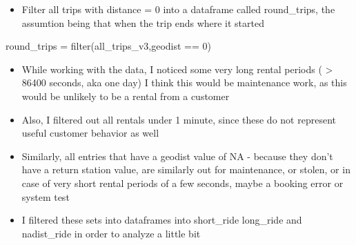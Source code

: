 \documentclass[
]{article}
\newenvironment{Shaded}{\begin{snugshade}}{\end{snugshade}}
\newcommand{\DecValTok}[1]{\textcolor[rgb]{0.00,0.00,0.81}{#1}}
\newcommand{\FunctionTok}[1]{\textcolor[rgb]{0.00,0.00,0.00}{#1}}
\newcommand{\NormalTok}[1]{#1}
\newcommand{\OtherTok}[1]{\textcolor[rgb]{0.56,0.35,0.01}{#1}}
\newcommand{\SpecialCharTok}[1]{\textcolor[rgb]{0.00,0.00,0.00}{#1}}
\providecommand{\tightlist}{%
  \setlength{\itemsep}{0pt}\setlength{\parskip}{0pt}}
\begin{document}
\fontsize{10}{12}
\selectfont

\begin{itemize}
\tightlist
\item
  Filter all trips with distance = 0 into a dataframe called
  round\_trips, the assumtion being that when the trip ends where it
  started
\end{itemize}

\fontsize{9}{11}
\selectfont

\begin{Shaded}
\begin{Highlighting}[]
\NormalTok{round\_trips }\OtherTok{=} \FunctionTok{filter}\NormalTok{(all\_trips\_v3,geodist }\SpecialCharTok{==} \DecValTok{0}\NormalTok{)}
\end{Highlighting}
\end{Shaded}

\fontsize{10}{12}
\selectfont

\begin{itemize}
\item
  While working with the data, I noticed some very long rental periods (
  \textgreater{} 86400 seconds, aka one day) I think this would be
  maintenance work, as this would be unlikely to be a rental from a
  customer
\item
  Also, I filtered out all rentals under 1 minute, since these do not
  represent useful customer behavior as well
\item
  Similarly, all entries that have a geodist value of NA - because they
  don't have a return station value, are similarly out for maintenance,
  or stolen, or in case of very short rental periods of a few seconds,
  maybe a booking error or system test
\item
  I filtered these sets into dataframes into short\_ride long\_ride and
  nadist\_ride in order to analyze a little bit
\end{itemize}

\fontsize{9}{11}
\selectfont

\begin{Shaded}
\end{Shaded}
\end{document}
